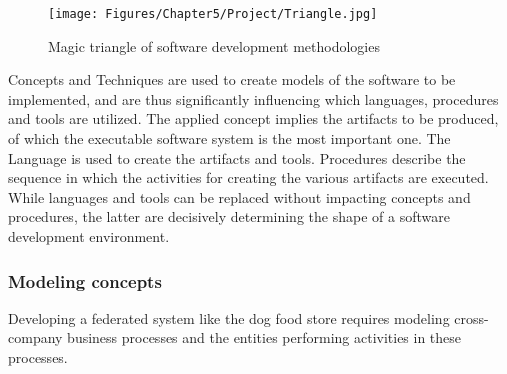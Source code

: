 \begin{figure}[htbp]
	\centering
	\texttt{[image: Figures/Chapter5/Project/Triangle.jpg]}
	\caption[Magic triangle of software development methodologies]{Magic triangle of software development methodologies}
	\label{fig:Triangle}
\end{figure}

Concepts and Techniques are used to create models of the software to be implemented, and are thus significantly influencing which languages, procedures and tools are utilized. The applied concept implies the artifacts to be produced, of which the executable software system is the most important one. The Language is used to create the artifacts and tools. Procedures describe the sequence in which the activities for creating the various artifacts are executed. While languages and tools can be replaced without impacting concepts and procedures, the latter are decisively determining the shape of a software development environment.
\\
\subsubsection{\textbf{Modeling concepts}}
Developing a federated system like the dog food store requires modeling cross-company business processes and the entities performing activities in these processes.
